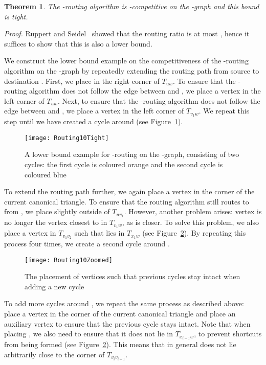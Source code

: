 \documentclass[12pt]{article}
\newtheorem{theo}[defin]{Theorem}
\newenvironment{theorem}{\begin{theo} \sl}{\end{theo}}
\newenvironment{proof}{\emph{Proof.}}{\hfill \\}
\newcommand{\canon}[2]{\ensuremath{T_{#1 #2}}}
\begin{document}
\begin{theorem}
  The -routing algorithm is -competitive on the -graph and this bound is tight. 
\end{theorem}
\begin{proof}
  Ruppert and Seidel~\cite{RS91} showed that the routing ratio is at most , hence it suffices to show that this is also a lower bound. 

  We construct the lower bound example on the competitiveness of the -routing algorithm on the -graph by repeatedly extending the routing path from source  to destination . First, we place  in the right corner of \canon{u}{w}. To ensure that the -routing algorithm does not follow the edge between  and , we place a vertex  in the left corner of \canon{u}{w}. Next, to ensure that the -routing algorithm does not follow the edge between  and , we place a vertex  in the left corner of \canon{v_1}{w}. We repeat this step until we have created a cycle around  (see Figure~\ref{fig:Routing10Tight}). 

  \begin{figure}[ht]
    \centering
    \texttt{[image: Routing10Tight]}
    \caption{A lower bound example for -routing on the -graph, consisting of two cycles: the first cycle is coloured orange and the second cycle is coloured blue}
    \label{fig:Routing10Tight}
  \end{figure}

  To extend the routing path further, we again place a vertex  in the corner of the current canonical triangle. To ensure that the routing algorithm still routes to  from , we place  slightly outside of \canon{u}{v_1}. However, another problem arises: vertex  is no longer the vertex closest to  in \canon{v_1}{w}, as  is closer. To solve this problem, we also place a vertex  in \canon{v_1}{v_2} such that  lies in \canon{x_1}{w} (see Figure~\ref{fig:Routing10Zoomed}). By repeating this process four times, we create a second cycle around . 

  \begin{figure}[ht]
    \centering
    \texttt{[image: Routing10Zoomed]}
    \caption{The placement of vertices such that previous cycles stay intact when adding a new cycle}
    \label{fig:Routing10Zoomed}
  \end{figure}

  To add more cycles around , we repeat the same process as described above: place a vertex in the corner of the current canonical triangle and place an auxiliary vertex to ensure that the previous cycle stays intact. Note that when placing , we also need to ensure that it does not lie in \canon{x_{i-1}}{w}, to prevent shortcuts from being formed (see Figure~\ref{fig:Routing10Zoomed}). This means that in general  does not lie arbitrarily close to the corner of \canon{v_i}{v_{i+1}}. 


\end{proof}
\end{document}
